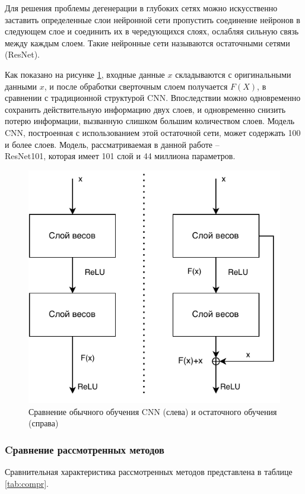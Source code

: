  Для решения проблемы дегенерации в глубоких сетях можно искусственно заставить определенные слои нейронной сети пропустить соединение нейронов в следующем слое и соединить их в чередующихся слоях, ослабляя сильную связь между каждым слоем. Такие нейронные сети называются остаточными сетями (ResNet).
 
 Как показано на рисунке \ref{fig:resnet}, входные данные $x$ складываются с оригинальными данными $x$, и после обработки сверточным слоем получается $F(X)$, в сравнении с традиционной структурой CNN. Впоследствии можно одновременно сохранить действительную информацию двух слоев, и одновременно снизить потерю информации, вызванную слишком большим количеством слоев. Модель CNN, построенная с использованием этой остаточной сети, может содержать 100 и более слоев. Модель, рассматриваемая в данной работе -- \\ResNet101, которая имеет 101 слой и 44 миллиона параметров.
 
 \begin{figure}[hbtp]
 	\centering
 	\includegraphics[width=\textwidth]{img/resnet.pdf}
 	\caption{Сравнение обычного обучения CNN (слева) и остаточного обучения (справа)}
 	\label{fig:resnet}
 \end{figure}
 \clearpage
 
 \subsubsection{Cравнение рассмотренных методов}
 Сравнительная характеристика рассмотренных методов представлена в
 таблице \ref{tab:compr}. 
 

